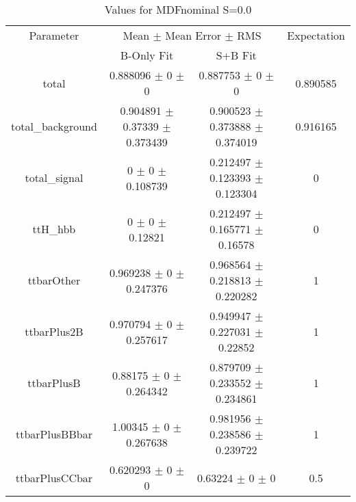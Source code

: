 \begin{table}
\centering
\caption{Values for MDFnominal S=0.0}
\begin{tabular}{cccc}
\toprule
Parameter & \multicolumn{2}{c}{Mean $\pm$ Mean Error $\pm$ RMS} & Expectation\\
 & B-Only Fit & S+B Fit & \\
\midrule
total & \num{0.888096} $\pm$ \num{0} $\pm$ \num{0} & \num{0.887753} $\pm$ \num{0} $\pm$ \num{0} & \num{0.890585}\\
total\_background & \num{0.904891} $\pm$ \num{0.37339} $\pm$ \num{0.373439} & \num{0.900523} $\pm$ \num{0.373888} $\pm$ \num{0.374019} & \num{0.916165}\\
total\_signal & \num{0} $\pm$ \num{0} $\pm$ \num{0.108739} & \num{0.212497} $\pm$ \num{0.123393} $\pm$ \num{0.123304} & \num{0}\\
ttH\_hbb & \num{0} $\pm$ \num{0} $\pm$ \num{0.12821} & \num{0.212497} $\pm$ \num{0.165771} $\pm$ \num{0.16578} & \num{0}\\
ttbarOther & \num{0.969238} $\pm$ \num{0} $\pm$ \num{0.247376} & \num{0.968564} $\pm$ \num{0.218813} $\pm$ \num{0.220282} & \num{1}\\
ttbarPlus2B & \num{0.970794} $\pm$ \num{0} $\pm$ \num{0.257617} & \num{0.949947} $\pm$ \num{0.227031} $\pm$ \num{0.22852} & \num{1}\\
ttbarPlusB & \num{0.88175} $\pm$ \num{0} $\pm$ \num{0.264342} & \num{0.879709} $\pm$ \num{0.233552} $\pm$ \num{0.234861} & \num{1}\\
ttbarPlusBBbar & \num{1.00345} $\pm$ \num{0} $\pm$ \num{0.267638} & \num{0.981956} $\pm$ \num{0.238586} $\pm$ \num{0.239722} & \num{1}\\
ttbarPlusCCbar & \num{0.620293} $\pm$ \num{0} $\pm$ \num{0} & \num{0.63224} $\pm$ \num{0} $\pm$ \num{0} & \num{0.5}\\
\bottomrule
\end{tabular}
\end{table}